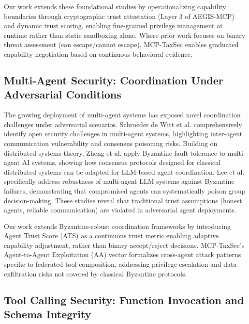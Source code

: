 \documentclass[12pt,twocolumn,journal]{IEEEtran}
\begin{document}
Our work extends these foundational studies by operationalizing capability boundaries through cryptographic trust attestation (Layer 3 of AEGIS-MCP) and dynamic trust scoring, enabling fine-grained privilege management at runtime rather than static sandboxing alone. Where prior work focuses on binary threat assessment (can escape/cannot escape), MCP-TaxSec enables graduated capability negotiation based on continuous behavioral evidence.

\subsection{Multi-Agent Security: Coordination Under Adversarial Conditions}

The growing deployment of multi-agent systems has exposed novel coordination challenges under adversarial scenarios. Schroeder de Witt et al. \cite{deWitt2026} comprehensively identify open security challenges in multi-agent systems, highlighting inter-agent communication vulnerability and consensus poisoning risks. Building on distributed systems theory, Zheng et al. \cite{Zheng2025} apply Byzantine fault tolerance to multi-agent AI systems, showing how consensus protocols designed for classical distributed systems can be adapted for LLM-based agent coordination. Lee et al. \cite{Lee2026} specifically address robustness of multi-agent LLM systems against Byzantine failures, demonstrating that compromised agents can systematically poison group decision-making. These studies reveal that traditional trust assumptions (honest agents, reliable communication) are violated in adversarial agent deployments.

Our work extends Byzantine-robust coordination frameworks by introducing Agent Trust Score (ATS) as a continuous trust metric enabling adaptive capability adjustment, rather than binary accept/reject decisions. MCP-TaxSec's Agent-to-Agent Exploitation (AA) vector formalizes cross-agent attack patterns specific to federated tool composition, addressing privilege escalation and data exfiltration risks not covered by classical Byzantine protocols.

\subsection{Tool Calling Security: Function Invocation and Schema Integrity}
\end{document}
